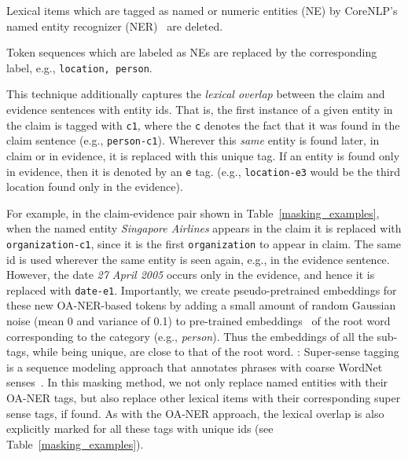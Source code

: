 {}
Lexical items which are tagged as named or numeric entities (NE) by CoreNLP's named entity recognizer (NER)~\citep{manning2014stanford} are deleted.

{}  Token sequences which are labeled as NEs are replaced by the corresponding label, e.g., \texttt{location, person}.

{} This technique additionally captures the \textit{lexical overlap} between the claim and evidence sentences with entity ids.
That is, the first instance of a given entity in the claim is tagged with \texttt{c1}, where the \texttt{c} denotes the fact that it was found in the claim sentence (e.g., \texttt{person-c1}). Wherever this {\em same} entity is found later, in claim or in evidence, it is replaced with this unique tag. If an entity is found only in evidence, then it is denoted by an \texttt{e} tag. (e.g., \texttt{location-e3} would be the third location found only in the evidence).

For example, in the claim-evidence pair shown in Table~\ref{masking_examples}, when the named entity \textit{Singapore Airlines} appears in the claim it is replaced with \texttt{organization-c1}, since it is the first \texttt{organization} to appear in claim.
The same id is used wherever the same entity is seen again, e.g., in the evidence sentence. However, the date \textit{27 April 2005} occurs only in the evidence, and hence it is replaced with \texttt{date-e1}.
Importantly, we create pseudo-pretrained embeddings for these new OA-NER-based tokens by adding a small amount of random Gaussian noise (mean 0 and variance of 0.1) to pre-trained embeddings~\citep{pennington2014glove} of the root word corresponding to the category (e.g., \textit{person}). Thus the embeddings of all the sub-tags, while being unique, are close to that of the root word.
{}:
Super-sense tagging is a sequence modeling approach that annotates phrases with coarse WordNet senses~\citep{ciaramita2003supersense,miller1990introduction}. In this masking method, we not only replace named entities with their OA-NER tags, but also replace other lexical items with their corresponding super sense tags, if found. As with the OA-NER approach, the lexical overlap is also explicitly marked for all these tags with unique ids (see Table~\ref{masking_examples}).


